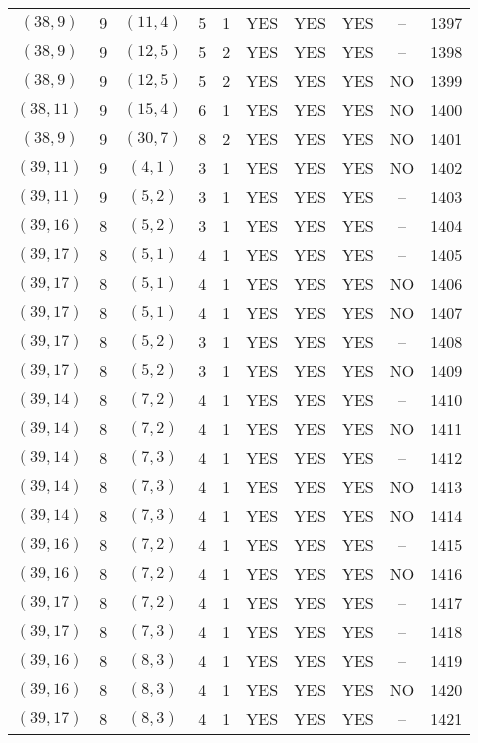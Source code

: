 \begin{longtable}{|c|c|c|c|c|c|c|c|c|c|}
$(38, 9)$ & 9 & $(11, 4)$ & 5 & 1 & YES & YES & YES & -- & 1397\\
$(38, 9)$ & 9 & $(12, 5)$ & 5 & 2 & YES & YES & YES & -- & 1398\\
$(38, 9)$ & 9 & $(12, 5)$ & 5 & 2 & YES & YES & YES & NO & 1399\\
$(38, 11)$ & 9 & $(15, 4)$ & 6 & 1 & YES & YES & YES & NO & 1400\\
$(38, 9)$ & 9 & $(30, 7)$ & 8 & 2 & YES & YES & YES & NO & 1401\\
$(39, 11)$ & 9 & $(4, 1)$ & 3 & 1 & YES & YES & YES & NO & 1402\\
$(39, 11)$ & 9 & $(5, 2)$ & 3 & 1 & YES & YES & YES & -- & 1403\\
$(39, 16)$ & 8 & $(5, 2)$ & 3 & 1 & YES & YES & YES & -- & 1404\\
$(39, 17)$ & 8 & $(5, 1)$ & 4 & 1 & YES & YES & YES & -- & 1405\\
$(39, 17)$ & 8 & $(5, 1)$ & 4 & 1 & YES & YES & YES & NO & 1406\\
$(39, 17)$ & 8 & $(5, 1)$ & 4 & 1 & YES & YES & YES & NO & 1407\\
$(39, 17)$ & 8 & $(5, 2)$ & 3 & 1 & YES & YES & YES & -- & 1408\\
$(39, 17)$ & 8 & $(5, 2)$ & 3 & 1 & YES & YES & YES & NO & 1409\\
$(39, 14)$ & 8 & $(7, 2)$ & 4 & 1 & YES & YES & YES & -- & 1410\\
$(39, 14)$ & 8 & $(7, 2)$ & 4 & 1 & YES & YES & YES & NO & 1411\\
$(39, 14)$ & 8 & $(7, 3)$ & 4 & 1 & YES & YES & YES & -- & 1412\\
$(39, 14)$ & 8 & $(7, 3)$ & 4 & 1 & YES & YES & YES & NO & 1413\\
$(39, 14)$ & 8 & $(7, 3)$ & 4 & 1 & YES & YES & YES & NO & 1414\\
$(39, 16)$ & 8 & $(7, 2)$ & 4 & 1 & YES & YES & YES & -- & 1415\\
$(39, 16)$ & 8 & $(7, 2)$ & 4 & 1 & YES & YES & YES & NO & 1416\\
$(39, 17)$ & 8 & $(7, 2)$ & 4 & 1 & YES & YES & YES & -- & 1417\\
$(39, 17)$ & 8 & $(7, 3)$ & 4 & 1 & YES & YES & YES & -- & 1418\\
$(39, 16)$ & 8 & $(8, 3)$ & 4 & 1 & YES & YES & YES & -- & 1419\\
$(39, 16)$ & 8 & $(8, 3)$ & 4 & 1 & YES & YES & YES & NO & 1420\\
$(39, 17)$ & 8 & $(8, 3)$ & 4 & 1 & YES & YES & YES & -- & 1421\\

\end{longtable}
